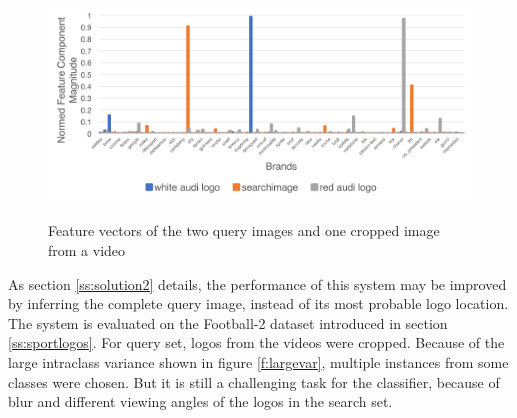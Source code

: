 \begin{figure}
  \centering
  \includegraphics[height=60mm]{images/mt/faster_confusion.png}
  \caption{Feature vectors of the two query images and one cropped image from a video}
  \label{f:fasterconfusion}
\end{figure}

As section \ref{ss:solution2} details, the performance of this system may be improved by inferring the complete query image, instead of its most probable logo location. The system is evaluated on the Football-2 dataset introduced in section \ref{ss:sportlogos}. For query set, logos from the videos were cropped. Because of the large intraclass variance shown in figure \ref{f:largevar}, multiple instances from some classes were chosen. But it is still a challenging task for the classifier, because of blur and different viewing angles of the logos in the search set.

